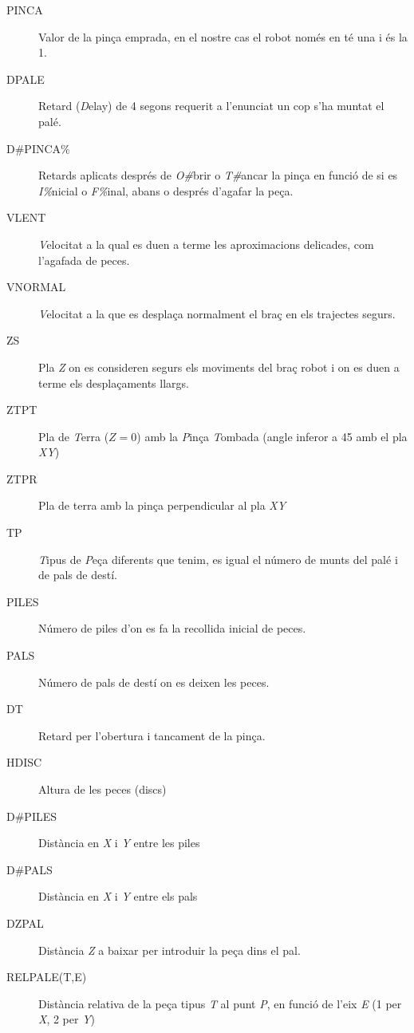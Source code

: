 \begin{description}\label{macprop}
\item [PINCA] Valor de la pinça emprada, en el nostre cas el robot només en té
una i és la 1.

\item [DPALE] Retard (\emph{D}elay) de 4 segons requerit a l'enunciat un cop
s'ha muntat el palé.

\item [D\#PINCA\%] Retards aplicats després de \emph{O\#}brir o
\emph{T\#}ancar la pinça en funció de si es \emph{I\%}nicial o \emph{F\%}inal,
abans o després d'agafar la peça.

\item [VLENT] \emph{V}elocitat a la qual es duen a terme les aproximacions
delicades, com l'agafada de peces.

\item [VNORMAL] \emph{V}elocitat a la que es desplaça normalment el braç en els
trajectes segurs.

\item [ZS] Pla \emph{Z} on es consideren segurs els moviments del braç robot i on
es duen a terme els desplaçaments llargs.

\item [ZTPT] Pla de \emph{T}erra ($Z = 0$) amb la \emph{P}inça \emph{T}ombada
(angle inferor a 45 amb el pla \emph{XY})

\item [ZTPR] Pla de terra amb la pinça perpendicular al pla \emph{XY}  
                                                                                                         
\item [TP] \emph{T}ipus de \emph{P}eça diferents que tenim, es igual el
número de munts del palé i de pals de destí.

\item [PILES] Número de piles d'on es fa la recollida inicial de peces.

\item [PALS] Número de pals de destí on es deixen les peces.

\item [DT] Retard per l'obertura i tancament de la pinça.

\item [HDISC] Altura de les peces (discs)

\item [D\#PILES] Distància en \emph{X} i \emph{Y} entre les piles

\item [D\#PALS] Distància en \emph{X} i \emph{Y} entre els pals

\item [DZPAL] Distància \emph{Z} a baixar per introduir la peça dins el pal.

\item [RELPALE(T,E)] Distància relativa de la peça tipus \emph{T} al punt
\emph{P}, en funció de l'eix \emph{E} (1 per \emph{X}, 2 per \emph{Y})
\end{description}

